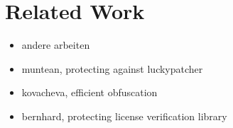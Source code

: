 \section{Related Work} \label{subsection:introduction-related}
\begin{itemize}
    \item andere arbeiten
    \item muntean, protecting against luckypatcher
    \item kovacheva, efficient obfuscation
    \item bernhard, protecting license verification library
\end{itemize}
